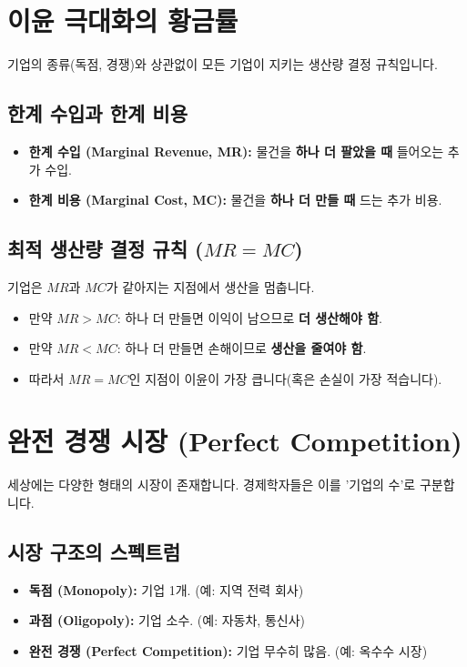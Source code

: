 \documentclass[11pt,a4paper]{book}
\begin{document}
\section{이윤 극대화의 황금률}

기업의 종류(독점, 경쟁)와 상관없이 모든 기업이 지키는 생산량 결정 규칙입니다.

\subsection{한계 수입과 한계 비용}

\begin{itemize}
    \item \textbf{한계 수입 (Marginal Revenue, MR):} 물건을 \textbf{하나 더 팔았을 때} 들어오는 추가 수입.
    \item \textbf{한계 비용 (Marginal Cost, MC):} 물건을 \textbf{하나 더 만들 때} 드는 추가 비용.
\end{itemize}

\subsection{최적 생산량 결정 규칙 ($MR = MC$)}
기업은 $MR$과 $MC$가 같아지는 지점에서 생산을 멈춥니다.
\begin{itemize}
    \item 만약 $MR > MC$: 하나 더 만들면 이익이 남으므로 \textbf{더 생산해야 함}.
    \item 만약 $MR < MC$: 하나 더 만들면 손해이므로 \textbf{생산을 줄여야 함}.
    \item 따라서 $MR = MC$인 지점이 이윤이 가장 큽니다(혹은 손실이 가장 적습니다).
\end{itemize}

\section{완전 경쟁 시장 (Perfect Competition)}

세상에는 다양한 형태의 시장이 존재합니다. 경제학자들은 이를 '기업의 수'로 구분합니다.

\subsection{시장 구조의 스펙트럼}
\begin{itemize}
    \item \textbf{독점 (Monopoly):} 기업 1개. (예: 지역 전력 회사)
    \item \textbf{과점 (Oligopoly):} 기업 소수. (예: 자동차, 통신사)
    \item \textbf{완전 경쟁 (Perfect Competition):} 기업 무수히 많음. (예: 옥수수 시장)
\end{itemize}
\end{document}
